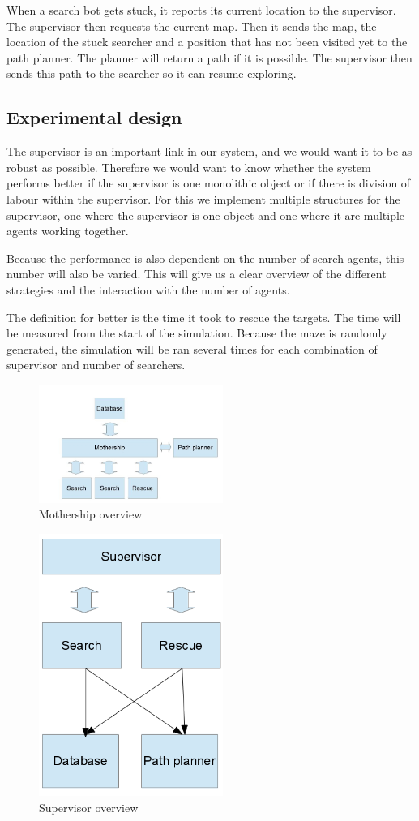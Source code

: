 When a search bot gets stuck, it reports its current location to the
supervisor. The supervisor then requests the current map. Then it sends the
map, the location of the stuck searcher and a position that has not been
visited yet to the path planner. The planner will return a path if it is
possible. The supervisor then sends this path to the searcher so it can
resume exploring.

\subsection{Experimental design}
The supervisor is an important link in our system, and we would want it to
be as robust as possible. Therefore we would want to know whether the
system performs better if the supervisor is one monolithic object or if
there is division of labour within the supervisor. For this we implement
multiple structures for the supervisor, one where the supervisor is one
object and one where it are multiple agents working together. 

Because the performance is also dependent on the number of search agents, this
number will also be varied. This will give us a clear overview of the
different strategies and the interaction with the number of agents. 

The definition for better is the time it took to rescue the targets.  The
time will be measured from the start of the simulation. Because the maze is
randomly generated, the simulation will be ran several times for each
combination of supervisor and number of searchers.


\begin{figure}[h]
	\centering
		\includegraphics[width=6cm]{mothership}
	\caption{Mothership overview}
	\label{fig:mothership}
\end{figure}

\begin{figure}[h]
	\centering
		\includegraphics[width=6cm]{supervisor}
	\caption{Supervisor overview}
	\label{fig:supervisor}
\end{figure}
